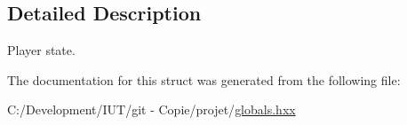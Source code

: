 \subsection{Detailed Description}
Player state. 

The documentation for this struct was generated from the following file\-:\begin{DoxyCompactItemize}
\item 
C\-:/\-Development/\-I\-U\-T/git -\/ Copie/projet/\hyperlink{globals_8hxx}{globals.\-hxx}\end{DoxyCompactItemize}
